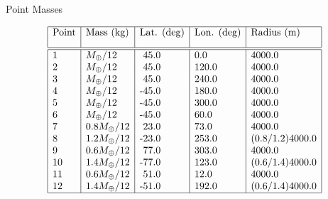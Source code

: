 \begin{description}
\begin{table}\caption{Point Masses} \label{pointmasses}
\smallskip
\[ \begin{array}{| l | l | l | l | l |}\hline
\mbox{Point} & \mbox{Mass (kg)} & \mbox{Lat. (deg)} & \mbox{Lon.
(deg)} & \mbox{Radius (m)}
\\*[0.3cm]\hline \hline

\mbox{1} & \mbox{$M_\oplus/12$} & \mbox{ 45.0} & \mbox{0.0} & \mbox{4000.0} \\

\mbox{2} & \mbox{$M_\oplus/12$} & \mbox{ 45.0} & \mbox{120.0} & \mbox{4000.0} \\

\mbox{3} & \mbox{$M_\oplus/12$} & \mbox{ 45.0} & \mbox{240.0} & \mbox{4000.0} \\

\mbox{4} & \mbox{$M_\oplus/12$} & \mbox{-45.0} & \mbox{180.0} & \mbox{4000.0} \\

\mbox{5} & \mbox{$M_\oplus/12$} & \mbox{-45.0} & \mbox{300.0} & \mbox{4000.0} \\

\mbox{6} & \mbox{$M_\oplus/12$} & \mbox{-45.0} & \mbox{60.0} & \mbox{4000.0} \\

\mbox{7} & \mbox{$0.8M_\oplus/12$} & \mbox{ 23.0} & \mbox{73.0} & \mbox{4000.0} \\

\mbox{8} & \mbox{$1.2M_\oplus/12$} & \mbox{-23.0} & \mbox{253.0} & \mbox{(0.8/1.2)4000.0} \\

\mbox{9} & \mbox{$0.6M_\oplus/12$} & \mbox{ 77.0} & \mbox{303.0} & \mbox{4000.0} \\

\mbox{10} & \mbox{$1.4M_\oplus/12$} & \mbox{-77.0} & \mbox{123.0} & \mbox{(0.6/1.4)4000.0} \\

\mbox{11} & \mbox{$0.6M_\oplus/12$} & \mbox{ 51.0} & \mbox{12.0} & \mbox{4000.0} \\

\mbox{12} & \mbox{1.4$M_\oplus/12$} & \mbox{-51.0} & \mbox{192.0} & \mbox{(0.6/1.4)4000.0} \\

\hline
\end{array} \]
\end{table}


\end{description}
